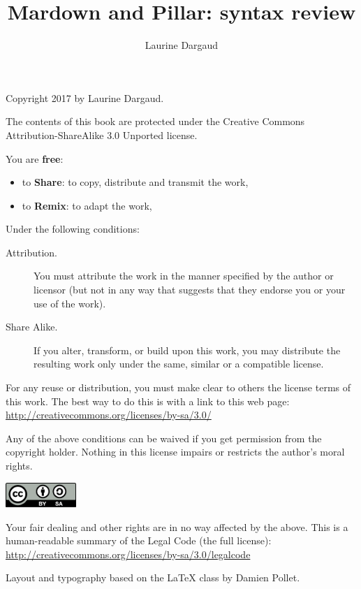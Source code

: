 \documentclass[10pt,twoside,english]{_support/latex/sbabook/sbabook}
\title{Mardown and Pillar: syntax review}
\author{Laurine Dargaud}
\begin{document}
\maketitle
\pagestyle{titlingpage}
\thispagestyle{titlingpage} %

\cleartoverso
{\small

  Copyright 2017 by Laurine Dargaud.

  The contents of this book are protected under the Creative Commons
  Attribution-ShareAlike 3.0 Unported license.

  You are \textbf{free}:
  \begin{itemize}
  \item to \textbf{Share}: to copy, distribute and transmit the work,
  \item to \textbf{Remix}: to adapt the work,
  \end{itemize}

  Under the following conditions:
  \begin{description}
  \item[Attribution.] You must attribute the work in the manner specified by the
    author or licensor (but not in any way that suggests that they endorse you
    or your use of the work).
  \item[Share Alike.] If you alter, transform, or build upon this work, you may
    distribute the resulting work only under the same, similar or a compatible
    license.
  \end{description}

  For any reuse or distribution, you must make clear to others the
  license terms of this work. The best way to do this is with a link to
  this web page: \\
  \url{http://creativecommons.org/licenses/by-sa/3.0/}

  Any of the above conditions can be waived if you get permission from
  the copyright holder. Nothing in this license impairs or restricts the
  author's moral rights.

  \begin{center}
    \includegraphics[width=0.2\textwidth]{_support/latex/sbabook/CreativeCommons-BY-SA.pdf}
  \end{center}

  Your fair dealing and other rights are in no way affected by the
  above. This is a human-readable summary of the Legal Code (the full
  license): \\
  \url{http://creativecommons.org/licenses/by-sa/3.0/legalcode}

  \vfill

  Layout and typography based on the  \LaTeX{} class by Damien
  Pollet.
}
\end{document}
